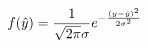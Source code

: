\documentclass[preview]{standalone}
\begin{document}
\begin{align*}
\special{dvisvgm:raw <g id='unique000'>}f(\hat{y})=\frac{1}{\sqrt{2\pi}\sigma}e^{-\frac{(y-\hat{y})^2}{2\sigma^2}}\special{dvisvgm:raw </g>}
\end{align*}
\end{document}
